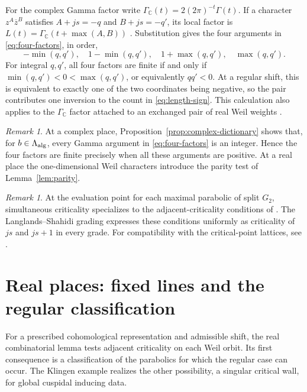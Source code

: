 \documentclass[12pt]{amsart}
\numberwithin{equation}{section}
\theoremstyle{plain}
\theoremstyle{definition}
\theoremstyle{remark}
\newtheorem{remark}[theorem]{Remark}
\renewcommand{\bar}{\overline}
\newcommand{\C}{\mathbb C}
\begin{document}
For the complex Gamma factor write $\Gamma_\C(t)=2(2\pi)^{-t}\Gamma(t)$. If a character $z^A\bar z^B$ satisfies $A+js=-q$ and $B+js=-q'$, its local factor is $L(t)=\Gamma_\C(t+\max(A,B))$ \cite[p.~13]{Tate1979}. Substitution gives the four arguments in \eqref{eq:four-factors}, in order,
\begin{equation}\label{eq:complex-arguments}
 -\min(q,q'),\quad 1-\min(q,q'),\quad 1+\max(q,q'),\quad\max(q,q').
\end{equation}
For integral $q,q'$, all four factors are finite if and only if $\min(q,q')<0<\max(q,q')$, or equivalently $qq'<0$. At a regular shift, this is equivalent to exactly one of the two coordinates being negative, so the pair contributes one inversion to the count in \eqref{eq:length-sign}. This calculation also applies to the $\Gamma_\C$ factor attached to an exchanged pair of real Weil weights \cite[(4.6)]{Knapp1994}. 

\begin{remark}
At a complex place, Proposition~\ref{prop:complex-dictionary} shows that, for $b\in\Lambda_{\rm alg}$, every Gamma argument in \eqref{eq:four-factors} is an integer. Hence the four factors are finite precisely when all these arguments are positive. At a real place the one-dimensional Weil characters introduce the parity test of Lemma~\ref{lem:parity}. 
\end{remark}

\begin{remark}\label{rem:simultaneous-names}
At the evaluation point for each maximal parabolic of split $G_2$, simultaneous criticality specializes to the adjacent-criticality conditions of \cite[\S5, Lemmas~6.1--6.2]{HosseiniJafariG2}. The Langlands--Shahidi
grading expresses these conditions uniformly as criticality of $js$ and $js+1$ in every grade. For compatibility with the critical-point lattices, see \cite[\S7.2]{HosseiniJafariG2}.
\end{remark}


\section{Real places: fixed lines and the regular classification} \label{sec:real-places}
For a prescribed cohomological representation and admissible shift, the real combinatorial lemma tests adjacent criticality on each Weil orbit. Its first consequence is a classification of the parabolics for which the regular case can occur. The Klingen example realizes the other possibility, a singular critical wall, for global cuspidal inducing data.
\end{document}

